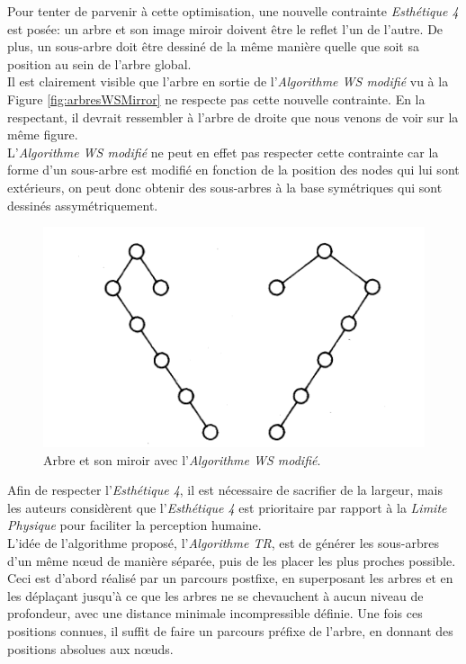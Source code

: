 \documentclass{article}
\begin{document}
  Pour tenter de parvenir à cette optimisation, une nouvelle contrainte \emph{Esthétique 4} est posée: un arbre et son image miroir doivent être le reflet l'un de l'autre. De plus, un sous-arbre doit être dessiné de la même manière quelle que soit sa position au sein de l'arbre global.\\

  Il est clairement visible que l'arbre en sortie de l'\emph{Algorithme WS modifié} vu à la Figure \ref{fig:arbresWSMirror} ne respecte pas cette nouvelle contrainte. En la respectant, il devrait ressembler à l'arbre de droite que nous venons de voir sur la même figure.\\
  
  L'\emph{Algorithme WS modifié} ne peut en effet pas respecter cette contrainte car la forme d'un sous-arbre est modifié en fonction de la position des nodes qui lui sont extérieurs, on peut donc obtenir des sous-arbres à la base symétriques qui sont dessinés assymétriquement.\\
  
 
  \begin{figure}[h]
    \begin{center}
        \includegraphics[scale=0.6]{comparArbreMiroirWS.png}
    \end{center}
    \caption{Arbre et son miroir avec l'\emph{Algorithme WS modifié}.
	\cite{article81}}
  \label{fig:comparArbreMiroirWS}
\end{figure}


  Afin de respecter l'\emph{Esthétique 4}, il est nécessaire de sacrifier de la largeur, mais les auteurs considèrent que l'\emph{Esthétique 4} est prioritaire par rapport à la \emph{Limite Physique} pour faciliter la perception humaine.\\
  
  L'idée de l'algorithme proposé, l'\emph{Algorithme TR}, est de générer les sous-arbres d'un même n\oe{}ud de manière séparée, puis de les placer les plus proches possible.
  Ceci est d'abord réalisé par un parcours postfixe, en superposant les arbres et en les déplaçant jusqu'à ce que les arbres ne se chevauchent à aucun niveau de profondeur, avec une distance minimale incompressible définie. Une fois ces positions connues, il suffit de faire un parcours préfixe de l'arbre, en donnant des positions absolues aux n\oe{}uds.\\
  
\end{document}
